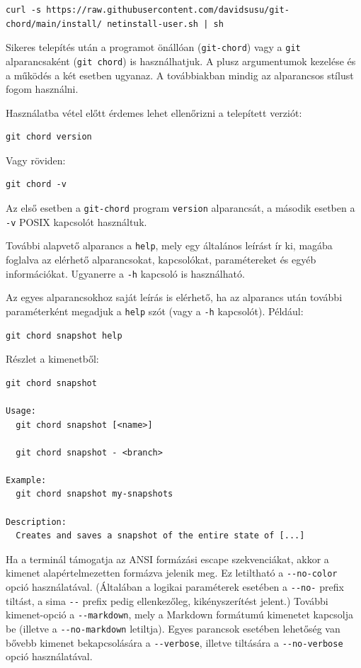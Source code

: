 \documentclass[
]{elteikthesis}[2025/03/25]
\begin{document}
\begin{verbatim}
curl -s https://raw.githubusercontent.com/davidsusu/git-chord/main/install/ netinstall-user.sh | sh
\end{verbatim}

Sikeres telepítés után a programot önállóan (\texttt{git-chord})
vagy a \texttt{git} alparancsaként (\texttt{git chord}) is használhatjuk.
A plusz argumentumok kezelése és a működés a két esetben ugyanaz.
A továbbiakban mindig az alparancsos stílust fogom használni.

Használatba vétel előtt érdemes lehet ellenőrizni a telepített verziót:

\begin{verbatim}
git chord version
\end{verbatim}

Vagy röviden:

\begin{verbatim}
git chord -v
\end{verbatim}

Az első esetben a \verb|git-chord| program \texttt{version} alparancsát,
a második esetben a \verb|-v| POSIX kapcsolót használtuk.

További alapvető alparancs a \verb|help|, mely egy általános leírást ír ki,
magába foglalva az elérhető alparancsokat, kapcsolókat, paramétereket és egyéb információkat.
Ugyanerre a \verb|-h| kapcsoló is használható.

Az egyes alparancsokhoz saját leírás is elérhető,
ha az alparancs után további paraméterként megadjuk a \verb|help| szót
(vagy a \verb|-h| kapcsolót).
Például:

\begin{verbatim}
git chord snapshot help
\end{verbatim}

Részlet a kimenetből:

\begin{verbatim}
git chord snapshot

Usage:
  git chord snapshot [<name>]

  git chord snapshot - <branch>

Example:
  git chord snapshot my-snapshots

Description:
  Creates and saves a snapshot of the entire state of [...]
\end{verbatim}

Ha a terminál támogatja az ANSI formázási escape szekvenciákat,
akkor a kimenet alapértelmezetten formázva jelenik meg.
Ez letiltható a \verb|--no-color| opció használatával.
(Általában a logikai paraméterek esetében a \verb|--no-| prefix tiltást,
a sima \verb|--| prefix pedig ellenkezőleg, kikényszerítést jelent.)
További kimenet-opció a \verb|--markdown|, mely a Markdown formátumú kimenetet kapcsolja be (illetve a \verb|--no-markdown| letiltja).
Egyes parancsok esetében lehetőség van bővebb kimenet bekapcsolására a \verb|--verbose|,
illetve tiltására a \verb|--no-verbose| opció használatával.
\end{document}
